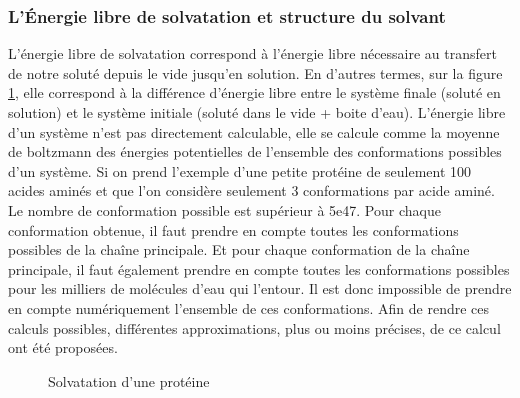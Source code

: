 \subsubsection{L'\'Energie libre de solvatation et structure du solvant}
L'énergie libre de solvatation correspond à l'énergie libre nécessaire au transfert de notre soluté depuis le vide jusqu'en solution. En d'autres termes, sur la figure \ref{fig:solvatation_def}, elle correspond à la différence d'énergie libre entre le système finale (soluté en solution) et le système initiale (soluté dans le vide + boite d'eau). L'énergie libre d'un système n'est pas directement calculable, elle se calcule comme la moyenne de boltzmann des énergies potentielles de l'ensemble des conformations possibles d'un système. Si on prend l'exemple d'une petite protéine de seulement 100 acides aminés et que l'on considère seulement 3 conformations par acide aminé. Le nombre de conformation possible est supérieur à 5e47. Pour chaque conformation obtenue, il faut prendre en compte toutes les conformations possibles de la chaîne principale. Et pour chaque conformation de la chaîne principale, il faut également prendre en compte toutes les conformations possibles pour les milliers de molécules d'eau qui l'entour. Il est donc impossible de prendre en compte numériquement l'ensemble de ces conformations. Afin de rendre ces calculs possibles, différentes approximations, plus ou moins précises, de ce calcul ont été proposées.


\begin{figure}[H]
  \center
      \caption{Solvatation d'une protéine}
      \label{fig:solvatation_def}
\end{figure}



